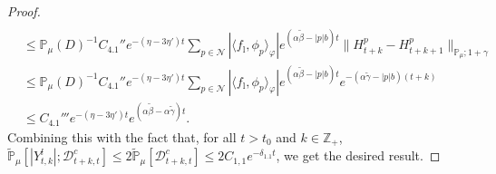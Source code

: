 \documentclass[12pt,a4paper]{amsart}
\theoremstyle{plain}
\theoremstyle{definition}
\numberwithin{equation}{section}
\begin{document}
\begin{proof}
\begin{align}
    \\ & \leq \mathbb P_{\mu}(D)^{-1} C_{4.1}'' e^{- (\eta - 3\eta') t}\sum_{p\in \mathcal {N}} |\langle f_\mathrm l,\phi_p\rangle_\varphi|  e^{(\alpha \tilde \beta  -|p|b)t} \| H_{t+k}^p-H_{t+k+1}^p \|_{\mathbb P_\mu; 1+\gamma}
    \\&\leq  \mathbb P_{\mu}(D)^{-1} C_{4.1}'' e^{- (\eta - 3\eta') t}\sum_{p\in \mathcal N} |\langle f_\mathrm l,\phi_p\rangle_\varphi|  e^{(\alpha \tilde \beta  -|p|b)t} e^{-(\alpha \tilde \gamma - |p|b)(t+k)} \\
    &  \leq  C_{4.1}''' e^{- (\eta - 3\eta') t} e^{(\alpha \tilde \beta - \alpha \tilde \gamma)t}.
  \end{align}
 Combining this with the fact that, for all $t>t_0$ and $k\in \mathbb Z_+$,  $\mathbb{\widetilde{P}}_{\mu} [|Y^l_{t,k}| ; \mathcal{D}^c_{t+k,t} ]\leq 2\mathbb{\widetilde{P}}_{\mu} [ \mathcal{D}^c_{t+k,t} ]\leq 2 C_{1,1}e^{-\delta_{1.1}t}$, we get the desired result.
\end{proof}
\end{document}
